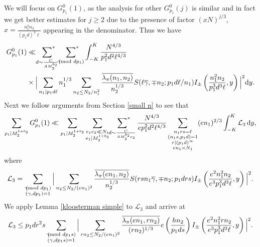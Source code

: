 \documentclass[12pt,a4paper,twoside, reqno]{amsart}
\newcommand{\shortmod}{\ensuremath{\negthickspace \negthickspace \negthickspace \pmod}}
\newcommand{\sumstar}{\sideset{}{^*}\sum}
\begin{document}
We will  focus on  $ G_{p_1}^0(1)$, as the  analysis for other $  G_{p_1}^0(j)$ is similar and in fact we get better estimates for $j \geq 2$ due to the presence of factor $(xN)^{j/3},$ $x=\frac{n_1^2 n_2}{(p_1d)^3 \ell}$ appearing in the denominator. 
Thus we have 
\begin{align}
       G_{p_1}^0(1) &\ll 
      \mathop{\sumstar_{ \substack{d \sim \frac{C}{A M_2^{b_2}}
       } } }   \sumstar_{\substack{ \gamma \shortmod{dp_1} }  }  \int_{-K}^K \frac{  N^{4/3}}{p_1^2d^2 \ell^{4/3}} \\ 
       & \times \Big| \sum_{n_1|p_1d\ell} n_1^{1/3}\sum_{n_2 \leq N_2/n_1^2} \frac{\overline{\lambda_\pi(n_1,n_2)}}{n_2^{1/3}} S(\ell \overline{\gamma}, \mp n_2;p_1d\ell /n_1 ) I_{\pm} \left( \frac{n_1^2n_2}{p_1^3d^3 \ell},y\right)  \Big|^2 \mathrm{d}y.
\end{align}
Next we follow arguments from Section \ref{small n} to see that 
\begin{align}\label{Gp2}
    \sum_{p_1| M_2^{1+b_2}} G_{p_1}^0(1)  \ll    \sum_{p_1| M_2^{1+b_2}} \mathop{\sum_{\substack {e_1e_2 \ll N_1 \\ e_1\mid M_2^{1+b_2} }   }}  \mathop{\sumstar_{ \substack{d \sim \frac{C}{A M_2^{b_2} e_2}
       } } }   \frac{ {N^{4/3}} }{ep_1^2d^2  {\ell^{4/3}}} \mathop{\sum_{ \substack{n_1rs= \ell \\ (n_1s,p_1d)=1 \\ r | (p_1d)^\infty \\ en_1 \asymp N_1  }}}  (en_1)^{2/3}  \int_{-K}^K  \mathcal{L}_3 \,  \mathrm{d}y,
\end{align}
where 
\begin{align*}
    \mathcal{L}_3= \sum_{\substack{ \gamma \shortmod{dp_1} \\ (\gamma, dp_1)=1 }   } \Big|   \sum_{n_2 \leq N_2/(en_1)^2}\frac{\overline{\lambda_\pi(en_1,n_2)}}{ {n_2^{1/3}}  }  S(rsn_1 \overline{\gamma}, \mp n_2;p_1drs) I_{\pm} \left( \frac{e^2n_1^2n_2}{e^3p_1^3d^3 \ell},y\right) \Big|^2.
\end{align*}
We apply Lemma \ref{kloosterman simple} to $ \mathcal{L}_3$ and arrive at 
\begin{align*}
    \mathcal{L}_3 \leq  p_1dr^2s \sum_{\substack{ \gamma \shortmod{dp_1s} \\ (\gamma, dp_1s)=1 }   } \Big| \sum_{rn_2 \leq  N_2/(en_1)^2}  \frac{\overline{\lambda_\pi(en_1,rn_2)}}{ {(rn_2)^{1/3}}  }  e\left( \frac{hn_2}{p_1ds}\right)   I_{\pm} \left( \frac{e^2n_1^2rn_2}{e^3p_1^3d^3 \ell},y\right)  \Big|^2.
\end{align*}
\end{document}
